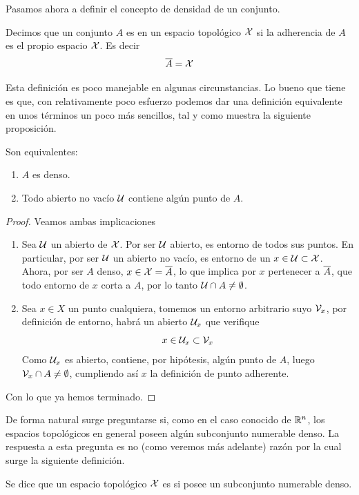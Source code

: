 Pasamos ahora a definir el concepto de densidad de un conjunto.
\begin{defi}
	\label{etop_def_denso}
	Decimos que un conjunto $A$ es  en un espacio topológico $\mathcal{X}$ si la adherencia de $A$ es el propio espacio $\mathcal{X}$. Es decir
	\begin{equation*}
	\overline{A}=\mathcal{X}
	\end{equation*}
\end{defi}
Esta definición es poco manejable en algunas circunstancias. Lo bueno que tiene es que, con relativamente poco esfuerzo podemos dar una definición equivalente en unos términos un poco más sencillos, tal y como muestra la siguiente proposición.
\begin{prop}
	Son equivalentes:
	\begin{enumerate}
		\item $A$ es denso.
		\item Todo abierto no vacío $\mathcal{U}$ contiene algún punto de $A$.
	\end{enumerate}
\end{prop}
\begin{proof} Veamos ambas implicaciones
	\begin{enumerate}
		\item[\bra] Sea $\mathcal{U}$ un abierto de $\mathcal{X}$. Por ser $\mathcal{U}$ abierto, es entorno de todos sus puntos. En particular, por ser $\mathcal{U}$ un abierto no vacío, es entorno de un $x \in \mathcal{U} \subset \mathcal{X}$. Ahora, por ser $A$ denso, $x \in \mathcal{X} = \overline{A}$, lo que implica por $x$ pertenecer a $\overline{A}$, que todo entorno de $x$ corta a $A$, por lo tanto $\mathcal{U}\cap A\not= \emptyset$.
		\item[\bla] Sea $x\in X$ un punto cualquiera, tomemos un entorno arbitrario suyo $\mathcal{V}_x$, por definición de entorno, habrá un abierto $\mathcal{U}_x$ que verifique
		\begin{equation*}
		x\in\mathcal{U}_x\subset\mathcal{V}_x
		\end{equation*}
		Como $\mathcal{U}_x$ es abierto, contiene, por hipótesis, algún punto de $A$, luego $\mathcal{V}_x\cap A\not=\emptyset$, cumpliendo así $x$ la definición de punto adherente.
	\end{enumerate}
	Con lo que ya hemos terminado.
\end{proof}
De forma natural surge preguntarse si, como en el caso conocido de $\mathbb{R}^n$, los espacios topológicos en general poseen algún subconjunto numerable denso. La respuesta a esta pregunta es no (como veremos más adelante) razón por la cual surge la siguiente definición.
\begin{defi}
	Se dice que un espacio topológico $\mathcal{X}$ es  si posee un subconjunto numerable denso.
\end{defi}


